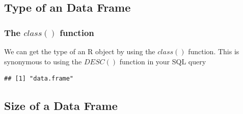 \documentclass[12pt]{book}\usepackage{knitr}
\begin{document}
\subsection{Type of an Data Frame}
\subsubsection{The $class()$ function}
\noindent We can get the type of an R object by using the $class()$ function. This is synonymous to using the $DESC()$ function in your SQL query  
\begin{knitrout}
\color{fgcolor}\begin{kframe}
\begin{alltt}
 
\end{alltt}
\begin{verbatim}
## [1] "data.frame"
\end{verbatim}
\end{kframe}
\end{knitrout}
\subsection{Size of a Data Frame}
\end{document}
